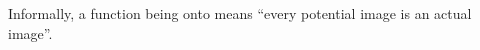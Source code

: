 
Informally, a function being onto means ``every potential image is an actual image''.

\phantom{Draw finite domain, finite codomain picture with duplicate image.}
\vspace{50pt}